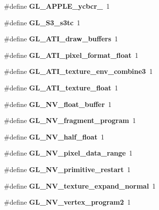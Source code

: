 \begin{DoxyCompactItemize}
\item 
\#define {\bfseries G\+L\+\_\+\+A\+P\+P\+L\+E\+\_\+ycbcr\+\_}~1\label{_s_d_l__opengl_8h_aff4dbaa3accc951aa03e012669286809}

\item 
\#define {\bfseries G\+L\+\_\+\+S3\+\_\+s3tc}~1\label{_s_d_l__opengl_8h_a5425b82a8a9f4c3f70e6e242755703e9}

\item 
\#define {\bfseries G\+L\+\_\+\+A\+T\+I\+\_\+draw\+\_\+buffers}~1\label{_s_d_l__opengl_8h_a0a34680c4e877cf208976bcaee791a75}

\item 
\#define {\bfseries G\+L\+\_\+\+A\+T\+I\+\_\+pixel\+\_\+format\+\_\+float}~1\label{_s_d_l__opengl_8h_a32bb18545a154142e47cb4fbf91ff84b}

\item 
\#define {\bfseries G\+L\+\_\+\+A\+T\+I\+\_\+texture\+\_\+env\+\_\+combine3}~1\label{_s_d_l__opengl_8h_ad80154a2770c957074b204606df27d2f}

\item 
\#define {\bfseries G\+L\+\_\+\+A\+T\+I\+\_\+texture\+\_\+float}~1\label{_s_d_l__opengl_8h_a992c237aafe08a10244e79bab4ba8626}

\item 
\#define {\bfseries G\+L\+\_\+\+N\+V\+\_\+float\+\_\+buffer}~1\label{_s_d_l__opengl_8h_af5edc6684e70aa26a341e7614cb3ef37}

\item 
\#define {\bfseries G\+L\+\_\+\+N\+V\+\_\+fragment\+\_\+program}~1\label{_s_d_l__opengl_8h_a3e9d81424503986192252b7015d304bb}

\item 
\#define {\bfseries G\+L\+\_\+\+N\+V\+\_\+half\+\_\+float}~1\label{_s_d_l__opengl_8h_a80ab2fac66e306c628eeca294b0edeb2}

\item 
\#define {\bfseries G\+L\+\_\+\+N\+V\+\_\+pixel\+\_\+data\+\_\+range}~1\label{_s_d_l__opengl_8h_a8d84d979477c94c653a18e26fcf54eb1}

\item 
\#define {\bfseries G\+L\+\_\+\+N\+V\+\_\+primitive\+\_\+restart}~1\label{_s_d_l__opengl_8h_a81a9a9d6ae4c34a230b3b8615a0409ff}

\item 
\#define {\bfseries G\+L\+\_\+\+N\+V\+\_\+texture\+\_\+expand\+\_\+normal}~1\label{_s_d_l__opengl_8h_aaf1bdebdae9d9dffffc8965c0a4aee68}

\item 
\#define {\bfseries G\+L\+\_\+\+N\+V\+\_\+vertex\+\_\+program2}~1\label{_s_d_l__opengl_8h_ab26dbe1d6deb547f67ce3d1304b633aa}


\end{DoxyCompactItemize}
